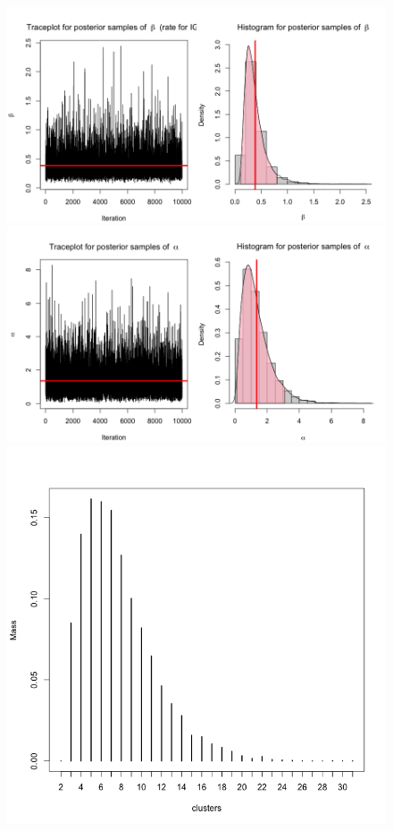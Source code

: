\documentclass[a4paper, 10pt]{article}
\begin{document}
\begin{enumerate}
    \begin{figure}[h!]
        \centering
        \includegraphics[scale = 0.4]{Prob3_beta.png}\\
        \includegraphics[scale = 0.4]{Prob3_alpha.png}\\
        \includegraphics[scale=0.3]{Prob3_clusters.png}

\end{figure}
\end{enumerate}
\end{document}
